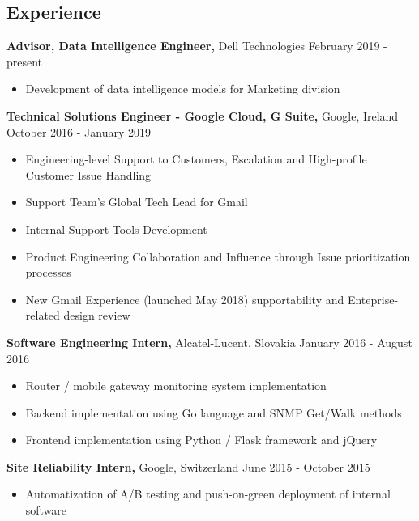 \documentclass[margin]{res}
\begin{document}
\begin{resume}


\section{Experience}

{\bf Advisor, Data Intelligence Engineer,} Dell Technologies \hfill February 2019 - present
\begin{itemize} \itemsep -2pt
\item Development of data intelligence models for Marketing division
\end{itemize}

{\bf Technical Solutions Engineer - Google Cloud, G Suite,} Google, Ireland \hfill October 2016 - January 2019
\begin{itemize} \itemsep -2pt %
\item Engineering-level Support to Customers, Escalation and High-profile Customer Issue Handling
\item Support Team's Global Tech Lead for Gmail
\item Internal Support Tools Development
\item Product Engineering Collaboration and Influence through Issue prioritization processes
\item New Gmail Experience (launched May 2018) supportability and Enteprise-related design review
\end{itemize}

{\bf Software Engineering Intern,} Alcatel-Lucent, Slovakia \hfill January 2016 - August 2016
\begin{itemize} \itemsep -2pt %
\item Router / mobile gateway monitoring system implementation
\item Backend implementation using Go language and SNMP Get/Walk methods
\item Frontend implementation using Python / Flask framework and jQuery
\end{itemize}

{\bf Site Reliability Intern,} Google, Switzerland \hfill June 2015 - October 2015
\begin{itemize} \itemsep -2pt %
\item Automatization of A/B testing and push-on-green deployment of internal software
\end{itemize}


\end{resume}
\end{document}
